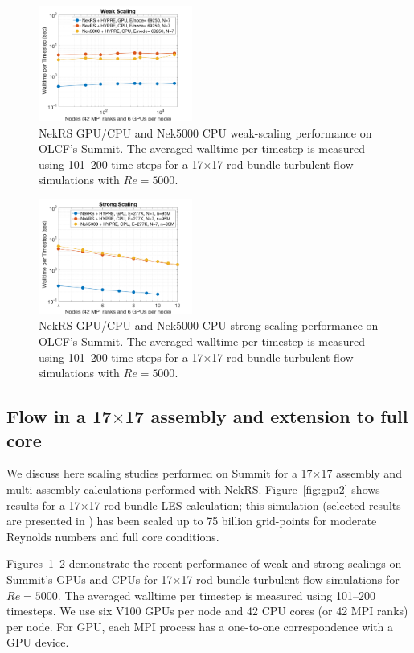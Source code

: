 \documentclass{anstrans}
\begin{document}
\begin{figure}[!ht]
\centering
\includegraphics[width=0.45\textwidth]{./Figures/nek_rod1717_weakscale.png}
\caption{NekRS GPU/CPU and Nek5000 CPU weak-scaling performance on OLCF's Summit.
The averaged walltime per timestep is measured using 101--200 time steps for
a 17$\times$17 rod-bundle turbulent flow simulations with $Re=5000$.}
\label{fig:nekrs1}
\end{figure}
\begin{figure}[!ht]
\centering
\includegraphics[width=0.45\textwidth]{./Figures/nek_rod1717_strongscale.png}
\caption{NekRS GPU/CPU and Nek5000 CPU strong-scaling performance on OLCF's Summit.
The averaged walltime per timestep is measured using 101--200 time steps for
a 17$\times$17 rod-bundle turbulent flow simulations with $Re=5000$.}
\label{fig:nekrs2}
\end{figure}


\subsection{Flow in a 17$\times$17 assembly and extension to full core}

We discuss here scaling studies performed on Summit for a 17$\times$17 assembly
and multi-assembly calculations performed with NekRS. Figure~\ref{fig:gpu2}
shows results for a 17$\times$17 rod bundle LES calculation; this simulation (selected
results are presented in \cite{merzari2020}) has been scaled up to 75 billion
grid-points for moderate Reynolds numbers and full core conditions.

\medskip
Figures~\ref{fig:nekrs1}--\ref{fig:nekrs2} demonstrate 
the recent performance of weak and strong scalings on Summit's GPUs 
and CPUs for 17$\times$17 rod-bundle turbulent flow simulations for $Re=5000$.
The averaged walltime per timestep is measured using 101–200 timesteps. 
We use six V100 GPUs per node and 42 CPU cores (or 42 MPI ranks) per node.
For GPU, each MPI process has a one-to-one correspondence with a GPU device. 
\end{document}
